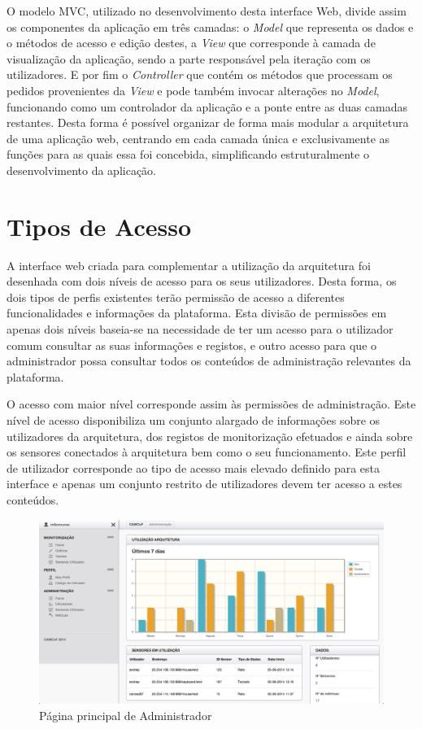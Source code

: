 O modelo MVC, utilizado no desenvolvimento desta interface Web, divide assim os componentes da aplicação em três camadas: o \textit{Model} que representa os dados e o métodos de acesso e edição destes, a \textit{View} que corresponde à camada de visualização da aplicação, sendo a parte responsável pela iteração com os utilizadores. E por fim o \textit{Controller} que contém os métodos que processam os pedidos provenientes da \textit{View} e pode também invocar alterações no \textit{Model}, funcionando como um controlador da aplicação e a ponte entre as duas camadas restantes. Desta forma é possível organizar de forma mais modular a arquitetura de uma aplicação web, centrando em cada camada única e exclusivamente as funções para as quais essa foi concebida, simplificando estruturalmente o desenvolvimento da aplicação.

\section{Tipos de Acesso}

A interface web criada para complementar a utilização da arquitetura foi desenhada com dois níveis de acesso para os seus utilizadores. Desta forma, os dois tipos de perfis existentes terão permissão de acesso a diferentes funcionalidades e informações da plataforma. Esta divisão de permissões em apenas dois níveis baseia-se na necessidade de ter um acesso para o utilizador comum consultar as suas informações e registos, e outro acesso para que o administrador possa consultar todos os conteúdos de administração relevantes da plataforma.

O acesso com maior nível corresponde assim às permissões de administração. Este nível de acesso disponibiliza um conjunto alargado de informações sobre os utilizadores da arquitetura, dos registos de monitorização efetuados e ainda sobre os sensores conectados à arquitetura bem como o seu funcionamento. Este perfil de utilizador corresponde ao tipo de acesso mais elevado definido para esta interface e apenas um conjunto restrito de utilizadores devem ter acesso a estes conteúdos.

 \begin{figure}[htb]
   \centering
   \includegraphics[scale=0.29]{Images/panel1.png}
   \caption{Página principal de Administrador}
\end{figure}

